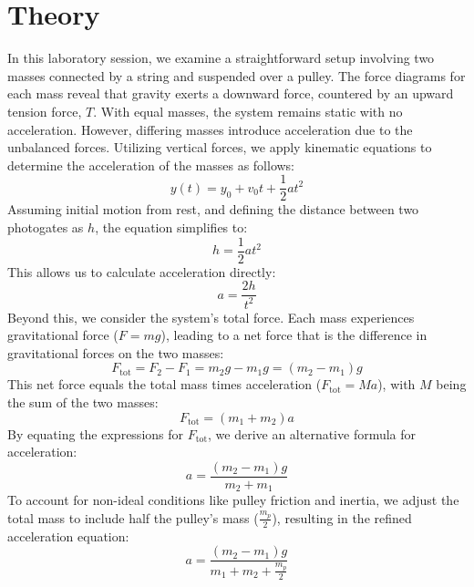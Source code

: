 \documentclass{report}
\begin{document}
    \bigbreak \noindent 
    \section{Theory}
    \bigbreak \noindent 
    \begin{figure}[ht]
        \centering
        \label{fig:pulley}
    \end{figure}
    \bigbreak \noindent 
    In this laboratory session, we examine a straightforward setup involving two masses connected by a string and suspended over a pulley. The force diagrams for each mass reveal that gravity exerts a downward force, countered by an upward tension force, $T$. With equal masses, the system remains static with no acceleration. However, differing masses introduce acceleration due to the unbalanced forces. Utilizing vertical forces, we apply kinematic equations to determine the acceleration of the masses as follows:
    \begin{equation}
    y(t) = y_0 + v_0t + \frac{1}{2}at^2
    \end{equation}
    Assuming initial motion from rest, and defining the distance between two photogates as $h$, the equation simplifies to:
    \begin{equation}
    h = \frac{1}{2}at^2
    \end{equation}
    This allows us to calculate acceleration directly:
    \begin{equation}
    a = \frac{2h}{t^2}
    \end{equation}
    Beyond this, we consider the system's total force. Each mass experiences gravitational force ($F = mg$), leading to a net force that is the difference in gravitational forces on the two masses:
    \begin{equation}
    F_{\text{tot}} = F_2 - F_1 = m_2g - m_1g = (m_2 - m_1)g
    \end{equation}
    This net force equals the total mass times acceleration ($F_{\text{tot}} = Ma$), with $M$ being the sum of the two masses:
    \begin{equation}
    F_{\text{tot}} = (m_1 + m_2)a
    \end{equation}
    By equating the expressions for $F_{\text{tot}}$, we derive an alternative formula for acceleration:
    \begin{equation}
    a = \frac{(m_2 - m_1)g}{m_2 + m_1}
    \end{equation}
    To account for non-ideal conditions like pulley friction and inertia, we adjust the total mass to include half the pulley's mass ($\frac{m_p}{2}$), resulting in the refined acceleration equation:
    \begin{equation}
    a = \frac{(m_2 - m_1)g}{m_1 + m_2 + \frac{m_p}{2}}
    \end{equation}
\end{document}
